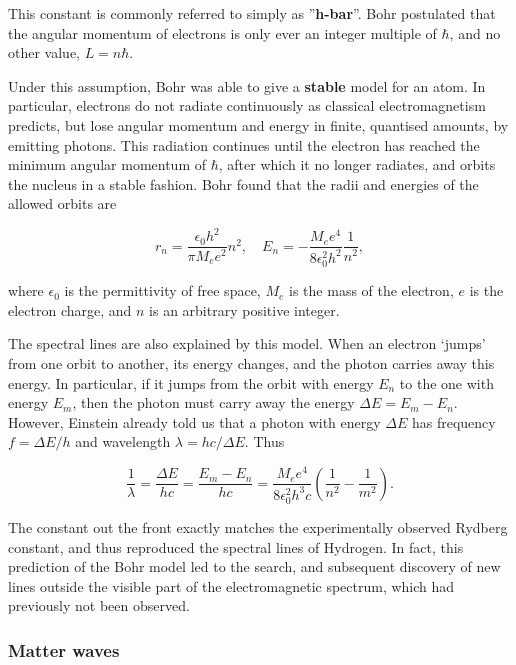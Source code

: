 \documentclass{article}
\begin{document}
This constant is commonly referred to simply as ''\textbf{h-bar}''. Bohr postulated that the angular momentum of electrons is only ever an integer multiple of $\hbar$, and no other value, $L = n\hbar$.

Under this assumption, Bohr was able to give a \textbf{stable} model for an atom. In particular, electrons do not radiate continuously as classical electromagnetism predicts, but lose angular momentum and energy in finite, quantised amounts, by emitting photons. This radiation continues until the electron has reached the minimum angular momentum of $\hbar$, after which it no longer radiates, and orbits the nucleus in a stable fashion. Bohr found that the radii and energies of the allowed orbits are

\begin{equation}
\label{e-Bohr-relations}
r_n = \frac{\epsilon_0 h^2 }{\pi M_e e^2}n^2,\quad E_n = -\frac{M_e e^4}{8 \epsilon_0^2 h^2} \frac{1}{n^2},
\end{equation}

where $\epsilon_0$ is the permittivity of free space, $M_e$ is the mass of the electron, $e$ is the electron charge, and $n$ is an arbitrary positive integer.

The spectral lines are also explained by this model. When an electron `jumps' from one orbit to another, its energy changes, and the photon carries away this energy. In particular, if it jumps from the orbit with energy $E_n$ to the one with energy $E_m$, then the photon must carry away the energy $\Delta E = E_m - E_n$.  However, Einstein already told us that a photon with energy $\Delta E$ has frequency $f = \Delta E/h$ and wavelength $\lambda = hc/\Delta E$. Thus

\begin{equation}
\frac{1}{\lambda} = \frac{\Delta E}{hc} = \frac{E_m - E_n}{hc} = \frac{M_e e^4}{8 \epsilon_0^2 h^3 c}\left(\frac{1}{n^2} - \frac{1}{m^2}\right).
\end{equation}

The constant out the front exactly matches the experimentally observed Rydberg constant, and thus reproduced the spectral lines of Hydrogen. In fact, this prediction of the Bohr model led to the search, and subsequent discovery of new lines outside the visible part of the electromagnetic spectrum, which had previously not been observed.

\subsubsection{Matter waves}\label{Matter waves}
\end{document}
